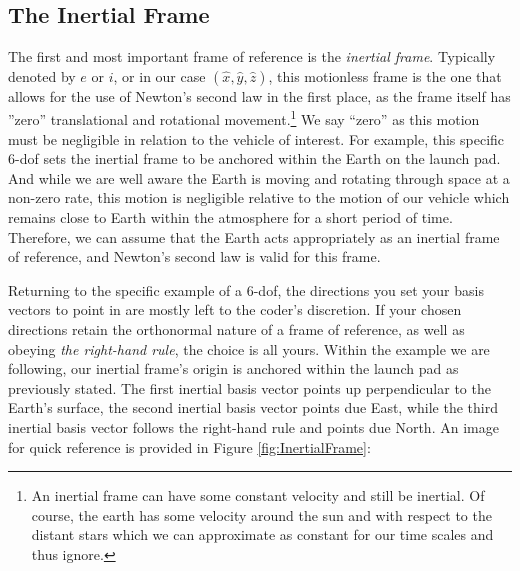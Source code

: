 \documentclass[12pt]{report}
\begin{document}
\subsection{The Inertial Frame}
The first and most important frame of reference is the \textit{inertial frame}. Typically denoted by $e$ or $i$, or in our case $(\hat{x},\hat{y},\hat{z})$, this motionless frame is the one that allows for the use of Newton’s second law in the first place, as the frame itself has ''zero'' translational and rotational movement.\footnote{An inertial frame can have some constant velocity and still be inertial. Of course, the earth has some velocity around the sun and with respect to the distant stars which we can approximate as constant for our time scales and thus ignore.} We say “zero” as this motion must be negligible in relation to the vehicle of interest. For example, this specific 6-\gls{dof} sets the inertial frame to be anchored within the Earth on the launch pad. And while we are well aware the Earth is moving and rotating through space at a non-zero rate, this motion is negligible relative to the motion of our vehicle which remains close to Earth within the atmosphere for a short period of time. Therefore, we can assume that the Earth acts appropriately as an inertial frame of reference, and Newton’s second law is valid for this frame. 

Returning to the specific example of a 6-\gls{dof}, the directions you set your basis vectors to point in are mostly left to the coder’s discretion. If your chosen directions retain the orthonormal nature of a frame of reference, as well as obeying \textit{the right-hand rule}, the choice is all yours. Within the example we are following, our inertial frame’s origin is anchored within the launch pad as previously stated. The first inertial basis vector points up perpendicular to the Earth’s surface, the second inertial basis vector points due East, while the third inertial basis vector follows the right-hand rule and points due North. An image for quick reference is provided in Figure \ref{fig:InertialFrame}:
\end{document}
